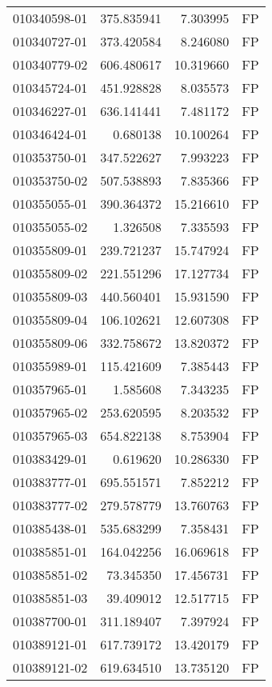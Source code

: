 \begin{tabular}{lrrl}
010340598-01 &  375.835941 &     7.303995 &   FP \\
010340727-01 &  373.420584 &     8.246080 &   FP \\
010340779-02 &  606.480617 &    10.319660 &   FP \\
010345724-01 &  451.928828 &     8.035573 &   FP \\
010346227-01 &  636.141441 &     7.481172 &   FP \\
010346424-01 &    0.680138 &    10.100264 &   FP \\
010353750-01 &  347.522627 &     7.993223 &   FP \\
010353750-02 &  507.538893 &     7.835366 &   FP \\
010355055-01 &  390.364372 &    15.216610 &   FP \\
010355055-02 &    1.326508 &     7.335593 &   FP \\
010355809-01 &  239.721237 &    15.747924 &   FP \\
010355809-02 &  221.551296 &    17.127734 &   FP \\
010355809-03 &  440.560401 &    15.931590 &   FP \\
010355809-04 &  106.102621 &    12.607308 &   FP \\
010355809-06 &  332.758672 &    13.820372 &   FP \\
010355989-01 &  115.421609 &     7.385443 &   FP \\
010357965-01 &    1.585608 &     7.343235 &   FP \\
010357965-02 &  253.620595 &     8.203532 &   FP \\
010357965-03 &  654.822138 &     8.753904 &   FP \\
010383429-01 &    0.619620 &    10.286330 &   FP \\
010383777-01 &  695.551571 &     7.852212 &   FP \\
010383777-02 &  279.578779 &    13.760763 &   FP \\
010385438-01 &  535.683299 &     7.358431 &   FP \\
010385851-01 &  164.042256 &    16.069618 &   FP \\
010385851-02 &   73.345350 &    17.456731 &   FP \\
010385851-03 &   39.409012 &    12.517715 &   FP \\
010387700-01 &  311.189407 &     7.397924 &   FP \\
010389121-01 &  617.739172 &    13.420179 &   FP \\
010389121-02 &  619.634510 &    13.735120 &   FP \\

\end{tabular}
